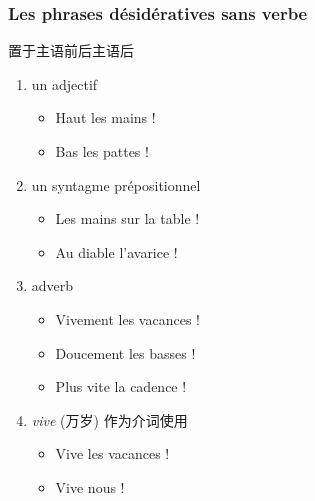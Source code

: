 \documentclass[UTF8]{report}
\begin{document}
\subsubsection{Les phrases désidératives sans verbe}
置于主语前后主语后
\begin{enumerate}
    \item un adjectif
    \begin{itemize}
        \item Haut les mains !
        \item Bas les pattes !
    \end{itemize}
    \item un syntagme prépositionnel 
    \begin{itemize}
        \item Les mains sur la table !
        \item Au diable l’avarice !
    \end{itemize}
    \item adverb
    \begin{itemize}
        \item Vivement les vacances !
        \item Doucement les basses !
        \item Plus vite la cadence !
    \end{itemize}
    \item \textit{vive} (万岁) 作为介词使用
    \begin{itemize}
        \item Vive les vacances !
        \item Vive nous !
    \end{itemize}
\end{enumerate}
\end{document}
